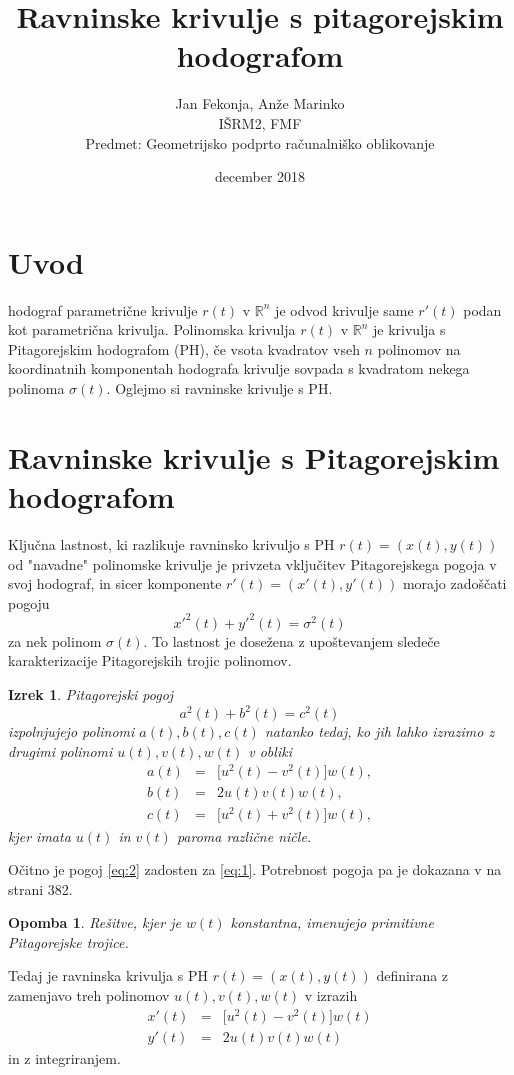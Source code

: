 \documentclass[a4paper]{IEEEtran}
\title{Ravninske krivulje s pitagorejskim hodografom}
\author{Jan Fekonja, Anže Marinko \\ IŠRM2, FMF \\ Predmet: Geometrijsko podprto računalniško oblikovanje}
\date{december 2018}
\newtheorem{theorem}{Izrek}
\newtheorem{remark}{Opomba}
\begin{document}
	\maketitle
	
	\section{Uvod}
	hodograf parametrične krivulje $r (t)$ v $\mathbb{R}^n$ je odvod krivulje same $r\prime (t)$ podan kot parametrična krivulja. Polinomska krivulja $r (t)$ v $\mathbb{R}^n$ je krivulja s Pitagorejskim hodografom (PH), če vsota kvadratov vseh $n$ polinomov na koordinatnih komponentah hodografa krivulje sovpada s kvadratom nekega polinoma $\sigma(t)$.
	Oglejmo si ravninske krivulje s PH.
	
	\section{Ravninske krivulje s Pitagorejskim hodografom}
	Ključna lastnost, ki razlikuje ravninsko krivuljo s PH $r (t) = (x (t), y (t))$ od "navadne" polinomske krivulje je privzeta vključitev Pitagorejskega pogoja v svoj hodograf, in sicer komponente $r\prime (t) = (x\prime (t), y\prime (t))$ morajo zadoščati pogoju $$x\prime^2(t) + y\prime^2(t)= \sigma^2 (t)$$ za nek polinom $\sigma(t)$. To lastnost je dosežena z upoštevanjem sledeče karakterizacije Pitagorejskih trojic polinomov.
	\begin{theorem}
		Pitagorejski pogoj
		\begin{equation} \label{eq:1}
		a^2 (t) + b^2 (t) = c^2 (t)
		\end{equation}
		izpolnjujejo polinomi $a (t), b (t), c (t)$ natanko tedaj, ko jih lahko izrazimo z drugimi polinomi $u (t), v (t), w (t)$ v obliki
		\begin{eqnarray} \label{eq:2}
		a (t) &=& \lbrack u^2(t)-v^2(t)\rbrack w(t),\nonumber\\
		b(t) &=& 2u(t)v(t)w(t),\\
		c(t) &=& \lbrack u^2(t)+v^2(t)\rbrack w(t),\nonumber
		\end{eqnarray}
		kjer imata $u(t)$ in $v(t)$ paroma različne ničle.
	\end{theorem}
	\proof
	Očitno je pogoj \eqref{eq:2} zadosten za \eqref{eq:1}. Potrebnost pogoja pa je dokazana v \cite{knjiga} na strani 382.
	\endproof
	\begin{remark} 
		Rešitve, kjer je $w(t)$ konstantna, imenujejo primitivne Pitagorejske trojice.
	\end{remark}
	Tedaj je ravninska krivulja s PH $r (t) = (x (t), y (t))$ definirana z zamenjavo treh polinomov $u (t), v (t), w (t)$ v izrazih
	\begin{eqnarray}\label{eq:3}
	x\prime(t) &=& \lbrack u^2(t)-v^2(t)\rbrack w(t)\\
	y\prime(t)&=&2u(t)v(t)w(t)\nonumber
	\end{eqnarray}
	in z integriranjem.
	
\end{document}
